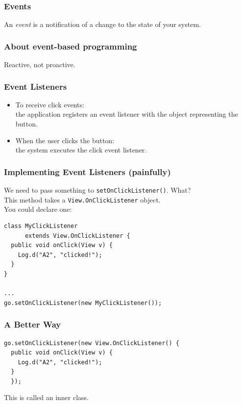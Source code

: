\documentclass[aspectratio=169]{beamer}
\begin{document}
\begin{frame}
\frametitle{Events}
\Large
An \emph{event} is a notification of a change to the state of your system.
\end{frame}

\begin{frame}
\frametitle{About event-based programming}
\Large Reactive, not proactive.
\end{frame}

\begin{frame}
\frametitle{Event Listeners}
\begin{itemize}
\item To receive click events: \\
the application registers an event 
listener with the object representing the button.\\
\item When the user clicks the button: \\
the system executes the click event listener.
\end{itemize}
\end{frame}


\begin{frame}[fragile]
\frametitle{Implementing Event Listeners (painfully)}
We need to pass something to {\tt setOnClickListener()}. What?\\[1em]

This method takes a {\tt View.OnClickListener} object.\\[1em]

You could declare one:

{\small
\begin{verbatim}
class MyClickListener 
      extends View.OnClickListener {
  public void onClick(View v) {
    Log.d("A2", "clicked!");
  }
}

...
go.setOnClickListener(new MyClickListener()); 
\end{verbatim}
}

\end{frame}

\begin{frame}[fragile]
\frametitle{A Better Way}

{\small
\begin{verbatim}
go.setOnClickListener(new View.OnClickListener() {
  public void onClick(View v) {
    Log.d("A2", "clicked!");
  }
  }); 
\end{verbatim}
}

{\Large This is called an \alert{inner class}.}

\end{frame}
\end{document}
